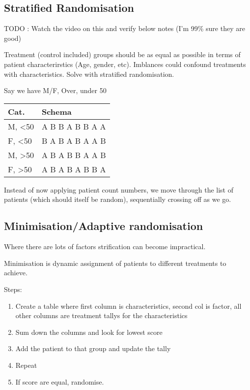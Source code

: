 \documentclass[
  letterpaper,
  DIV=11,
  numbers=noendperiod]{scrreprt}
\providecommand{\tightlist}{%
  \setlength{\itemsep}{0pt}\setlength{\parskip}{0pt}}\usepackage{longtable,booktabs,array}
\begin{document}
\hypertarget{stratified-randomisation}{%
\subsection{Stratified Randomisation}\label{stratified-randomisation}}

TODO : Watch the video on this and verify below notes (I'm 99\% sure
they are good)

Treatment (control included) groups should be as equal as possible in
terms of patient characterirstics (Age, gender, etc). Imblances could
confound treatments with characteristics. Solve with stratified
randomisation.

Say we have M/F, Over, under 50

\begin{longtable}[]{@{}ll@{}}
\toprule()
Cat. & Schema \\
\midrule()
\endhead
M, \textless50 & A B B A B B A A \\
F, \textless50 & B A B A B A A B \\
M, \textgreater50 & A B A B B A A B \\
F, \textgreater50 & A B A B A B B A \\
\bottomrule()
\end{longtable}

Instead of now applying patient count numbers, we move through the list
of patients (which should itself be random), sequentially crossing off
as we go.

\hypertarget{minimisationadaptive-randomisation}{%
\subsection{Minimisation/Adaptive
randomisation}\label{minimisationadaptive-randomisation}}

Where there are lots of factors strification can become impractical.

Minimisation is dynamic assignment of patients to different treatments
to achieve.

Steps:

\begin{enumerate}
\def\labelenumi{\arabic{enumi})}
\tightlist
\item
  Create a table where first column is characteristics, second col is
  factor, all other columns are treatment tallys for the characteristics
\item
  Sum down the columns and look for lowest score
\item
  Add the patient to that group and update the tally
\item
  Repeat
\item
  If score are equal, randomise.
\end{enumerate}
\end{document}
